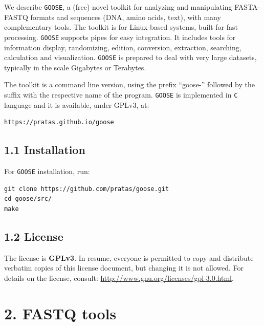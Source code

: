 \documentclass[11pt,journal,compsoc]{report}[1]
\begin{document}
We describe \texttt{GOOSE}, a (free) novel toolkit for analyzing and manipulating
FASTA-FASTQ formats and sequences (DNA, amino acids, text), with many 
complementary tools. The toolkit is for Linux-based systems, built for fast 
processing. \texttt{GOOSE} supports pipes for easy integration. It includes tools 
for information display, randomizing, edition, conversion, extraction, 
searching, calculation and visualization. \texttt{GOOSE} is prepared to deal with
very large datasets, typically in the scale Gigabytes or Terabytes. 

The toolkit is a command line version, using the prefix ``goose-'' 
followed by the suffix with the respective name of the program.
\texttt{GOOSE} is implemented in \texttt{C} language and it is available, 
under GPLv3, at:
\begin{lstlisting}
https://pratas.github.io/goose
\end{lstlisting}

\section*{1.1 Installation}

For \texttt{GOOSE} installation, run:
\begin{lstlisting}
git clone https://github.com/pratas/goose.git
cd goose/src/
make
\end{lstlisting}

\section*{1.2 License}

The license is \textbf{GPLv3}. In resume, everyone is permitted to copy and 
distribute verbatim copies of this license document, but changing it is not 
allowed. For details on the license, consult: \url{http://www.gnu.org/licenses/gpl-3.0.html}.

\chapter*{2. FASTQ tools}
\label{fastq}
\end{document}
